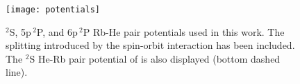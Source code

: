	\begin{figure}
		\begin{center}
			\texttt{[image: potentials]}
		\end{center}
		\caption{$^2$S, 5p$\,^2$P, and 6p$\,^2$P Rb-He pair potentials used in this work. The splitting introduced by the spin-orbit interaction has been included. The $^2$S He-Rb pair potential of is also displayed (bottom dashed line).}
		\label{fig:potentials}
	\end{figure}

	\cleardoublepage
	
%	
	